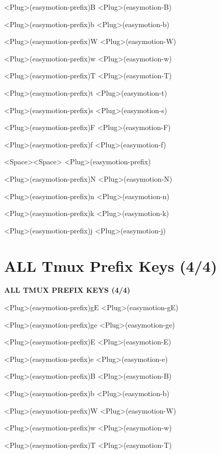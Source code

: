 \documentclass[11pt,a4paper,twoside]{book}
\begin{document}
<Plug>(easymotion-prefix)B  <Plug>(easymotion-B)

<Plug>(easymotion-prefix)b  <Plug>(easymotion-b)

<Plug>(easymotion-prefix)W  <Plug>(easymotion-W)

<Plug>(easymotion-prefix)w  <Plug>(easymotion-w)

<Plug>(easymotion-prefix)T  <Plug>(easymotion-T)

<Plug>(easymotion-prefix)t  <Plug>(easymotion-t)

<Plug>(easymotion-prefix)s  <Plug>(easymotion-s)

<Plug>(easymotion-prefix)F  <Plug>(easymotion-F)

<Plug>(easymotion-prefix)f  <Plug>(easymotion-f)

<Space><Space>  <Plug>(easymotion-prefix)

<Plug>(easymotion-prefix)N  <Plug>(easymotion-N)

<Plug>(easymotion-prefix)n  <Plug>(easymotion-n)

<Plug>(easymotion-prefix)k  <Plug>(easymotion-k)

<Plug>(easymotion-prefix)j  <Plug>(easymotion-j)


\vspace{16pt}

\section{ALL Tmux Prefix Keys (4/4)}


\vspace{10pt}
{\large\bfseries\color{neoncyan} ALL TMUX PREFIX KEYS (4/4)}\vspace{6pt}

<Plug>(easymotion-prefix)gE  <Plug>(easymotion-gE)

<Plug>(easymotion-prefix)ge  <Plug>(easymotion-ge)

<Plug>(easymotion-prefix)E  <Plug>(easymotion-E)

<Plug>(easymotion-prefix)e  <Plug>(easymotion-e)

<Plug>(easymotion-prefix)B  <Plug>(easymotion-B)

<Plug>(easymotion-prefix)b  <Plug>(easymotion-b)

<Plug>(easymotion-prefix)W  <Plug>(easymotion-W)

<Plug>(easymotion-prefix)w  <Plug>(easymotion-w)

<Plug>(easymotion-prefix)T  <Plug>(easymotion-T)
\end{document}
